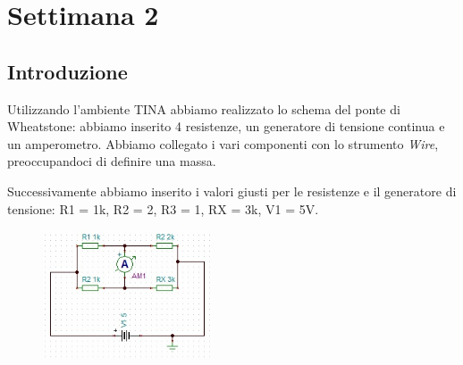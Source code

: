 \chapter{Settimana 2}

\section{Introduzione}



Utilizzando l'ambiente TINA abbiamo realizzato lo schema del ponte di Wheatstone: abbiamo inserito 4 resistenze, un generatore di tensione continua e un amperometro. Abbiamo collegato i vari componenti con lo strumento \textit{Wire}, preoccupandoci di definire una massa.

 Successivamente abbiamo inserito i valori giusti per le resistenze e il generatore di tensione: R1 = 1k, R2 = 2, R3 = 1, RX = 3k, V1 = 5V.

\begin{figure}[H]
\caption{}
    \includegraphics[width=5cm]{settimana_2/immagini/ponte_1.jpg}\label{fig::ponte}
    \centering
\end{figure}

